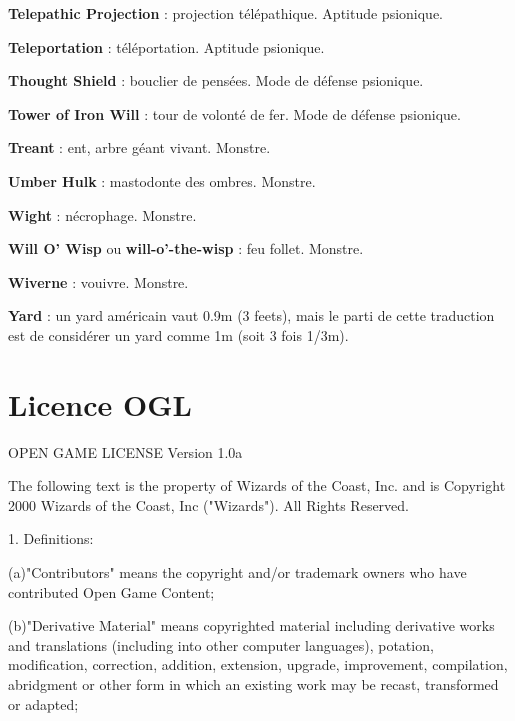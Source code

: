 \documentclass[11pt]{article}
\begin{document}
{\textbf{Telepathic Projection} : projection télépathique. Aptitude psionique.

\textbf{Teleportation} : téléportation. Aptitude psionique.

\textbf{Thought Shield} : bouclier de pensées. Mode de défense psionique.

\textbf{Tower of Iron Will} : tour de volonté de fer. Mode de défense psionique.

\textbf{Treant} : ent, arbre géant vivant. Monstre.

\textbf{Umber Hulk} : mastodonte des ombres. Monstre.

\textbf{Wight} : nécrophage. Monstre.

\textbf{Will O’ Wisp} ou \textbf{will-o'-the-wisp} : feu follet. Monstre.

\textbf{Wiverne} : vouivre. Monstre.

\textbf{Yard} : un yard américain vaut 0.9m (3 feets), mais le parti de cette traduction est de considérer un yard comme 1m (soit 3 fois 1/3m).

}%


\newpage
{}\section*{Licence OGL}
\label{OGL}

OPEN GAME LICENSE Version 1.0a

\bigskip

The following text is the property of Wizards of the Coast, Inc. and is Copyright 2000 Wizards of the Coast, Inc ("Wizards"). All Rights Reserved.

\bigskip

1. Definitions:

\bigskip

(a)"Contributors" means the copyright and/or trademark owners who have contributed Open Game Content;

\bigskip

(b)"Derivative Material" means copyrighted material including derivative works and translations (including into other computer languages), potation, modification, correction, addition, extension, upgrade, improvement, compilation, abridgment or other form in which an existing work may be recast, transformed or adapted;

\bigskip
\end{document}
